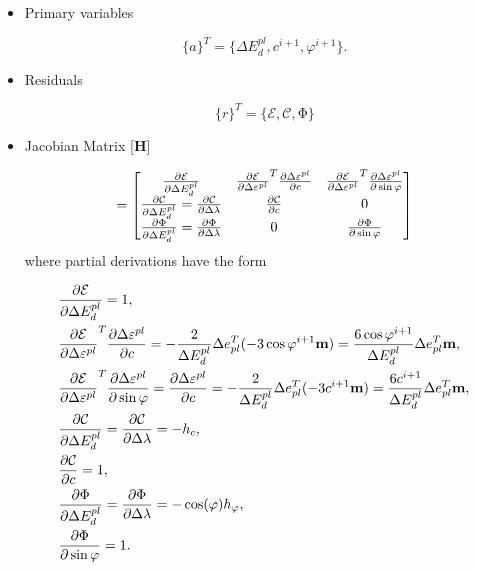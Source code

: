 \begin{itemize}
	\item Primary variables
	
	\begin{equation}
		\lbrace a \rbrace^T = \lbrace \Delta E_d^{pl}, c^{i+1}, \varphi^{i+1} \rbrace.
	\end{equation}
	
	\item Residuals
	
	\begin{equation}
		\lbrace r \rbrace ^T = \lbrace \mathcal{E}, \mathcal{C}, \mathrm{\Phi} \rbrace
	\end{equation}
	
	\item Jacobian Matrix [\textbf{H}]
	
	\begin{equation}
		[\text{\textbf{H}}] = \mqty[\pdv{\mathcal{E}}{\Delta E_d^{pl}} & \pdv{\mathcal{E}}{\Delta\varepsilon^{pl}}^T \pdv{\Delta\varepsilon^{pl}}{c} & \pdv{\mathcal{E}}{\Delta\varepsilon^{pl}}^T \pdv{\Delta\varepsilon^{pl}}{\sin \varphi}\\
		\pdv{\mathcal{C}}{\Delta E_d^{pl}} = \pdv{\mathcal{C}}{\Delta \lambda} & \pdv{\mathcal{C}}{c} & 0 \\
		\pdv{\mathrm{\Phi}}{\Delta E_d^{pl}} = \pdv{\mathrm{\Phi}}{\Delta \lambda} & 0 & \pdv{\mathrm{\Phi}}{\sin \varphi}]
	\end{equation}
	\newpage
	where partial derivations have the form\
	
	\begin{align}
		&\pdv{\mathcal{E}}{\Delta E_d^{pl}} = 1,\\
		&\pdv{\mathcal{E}}{\Delta\varepsilon^{pl}}^T \pdv{\Delta\varepsilon^{pl}}{c} =  -\dfrac{2}{\Delta E_d^{pl}} \Delta e_{pl}^T (-3\cos\varphi^{i+1}\textbf{m}) = \dfrac{6\cos\varphi^{i+1}}{ \Delta E_d^{pl}} \Delta e_{pl}^T \textbf{m},\\
		&\pdv{\mathcal{E}}{\Delta\varepsilon^{pl}}^T \pdv{\Delta\varepsilon^{pl}}{\sin \varphi} = \pdv{\Delta\varepsilon^{pl}}{c} =  -\dfrac{2}{ \Delta E_d^{pl}} \Delta e_{pl}^T (-3c^{i+1}\textbf{m}) = \dfrac{6 c^{i+1}}{ 
		 \Delta	E_d^{pl}} \Delta e_{pl}^T \textbf{m} ,\\
		&\pdv{\mathcal{C}}{\Delta E_d^{pl}} = \pdv{\mathcal{C}}{\Delta \lambda} =  -h_c,\\
		&\pdv{\mathcal{C}}{c} = 1,\\
		&\pdv{\mathrm{\Phi}}{\Delta E_d^{pl}} = \pdv{\mathrm{\Phi}}{\Delta \lambda} = -\cos(\varphi) h_{\varphi} ,\\
		&\pdv{\mathrm{\Phi}}{\sin \varphi} = 1.
	\end{align}
	

\end{itemize}
